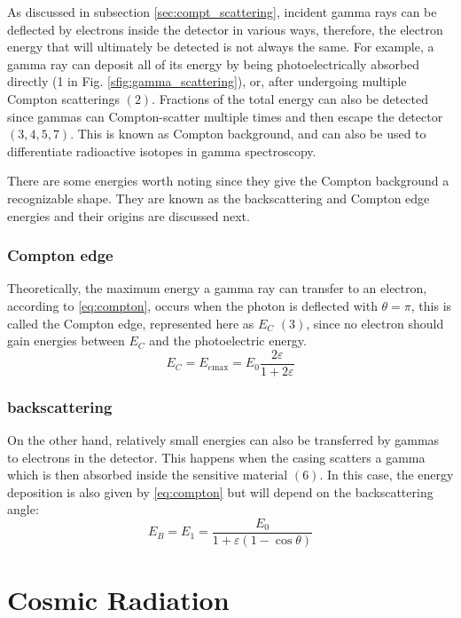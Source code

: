 As discussed in subsection \ref{sec:compt_scattering}, incident gamma rays can be deflected by electrons inside the detector in various ways, therefore, the electron energy that will ultimately be detected is not always the same. For example, a gamma ray can deposit all of its energy by being photoelectrically absorbed directly (1 in Fig. \ref{sfig:gamma_scattering}), or, after undergoing multiple Compton scatterings $(2)$. Fractions of the total energy can also be detected since gammas can Compton-scatter multiple times and then escape the detector $(3, 4, 5, 7)$. This is known as Compton background, and can also be used to differentiate radioactive isotopes in gamma spectroscopy.

There are some energies worth noting since they give the Compton background a recognizable shape. They are known as the backscattering and Compton edge energies and their origins are discussed next.

\subsubsection{Compton edge}

Theoretically, the maximum energy a gamma ray can transfer to an electron, according to \eqref{eq:compton}, occurs when the photon is deflected with $\theta=\pi$, this is called the Compton edge, represented here as $E_C$ $(3)$, since no electron should gain energies between $E_C$ and the photoelectric energy.
\begin{equation}
  E_C=E_{e\text{max}}=E_0\frac{2\varepsilon}{1+2\varepsilon}
\end{equation}

\subsubsection{backscattering}
On the other hand, relatively small energies can also be transferred by gammas to electrons in the detector. This happens when the casing scatters a gamma which is then absorbed inside the sensitive material $(6)$. In this case, the energy deposition is also given by \eqref{eq:compton} but will depend on the backscattering angle:
\begin{equation}
    E_B=E_1=\frac{E_0}{1+\varepsilon(1-\cos\theta)}
\end{equation}

\section{Cosmic Radiation}

